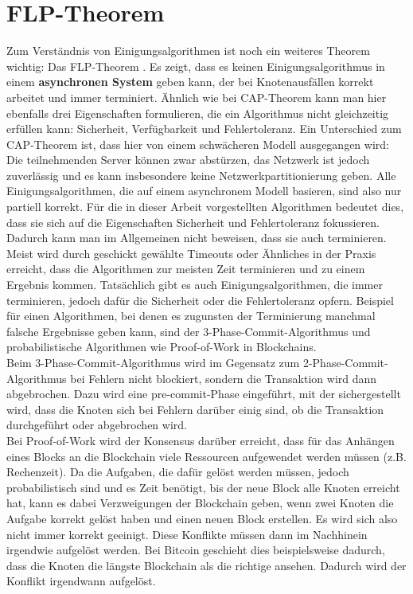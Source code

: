 \section{FLP-Theorem}

Zum Verständnis von Einigungsalgorithmen ist noch ein weiteres Theorem wichtig: Das FLP-Theorem \cite{flp}. Es zeigt, dass es keinen Einigungsalgorithmus in einem \textbf{asynchronen System} geben kann, der bei Knotenausfällen korrekt arbeitet und immer terminiert. Ähnlich wie bei CAP-Theorem kann man hier ebenfalls drei Eigenschaften formulieren, die ein Algorithmus nicht gleichzeitig erfüllen kann: Sicherheit, Verfügbarkeit und Fehlertoleranz. Ein Unterschied zum CAP-Theorem ist, dass hier von einem schwächeren Modell ausgegangen wird: Die teilnehmenden Server können zwar abstürzen, das Netzwerk ist jedoch zuverlässig und es kann insbesondere keine Netzwerkpartitionierung geben.
Alle Einigungsalgorithmen, die auf einem asynchronem Modell basieren, sind also nur partiell korrekt. Für die in dieser Arbeit vorgestellten Algorithmen bedeutet dies, dass sie sich auf die Eigenschaften Sicherheit und Fehlertoleranz fokussieren. Dadurch kann man im Allgemeinen nicht beweisen, dass sie auch terminieren. Meist wird durch geschickt gewählte Timeouts oder Ähnliches in der Praxis erreicht, dass die Algorithmen zur meisten Zeit terminieren und zu einem Ergebnis kommen.
Tatsächlich gibt es auch Einigungsalgorithmen, die immer terminieren, jedoch dafür die Sicherheit oder die Fehlertoleranz opfern. Beispiel für einen Algorithmen, bei denen es zugunsten der Terminierung manchmal falsche Ergebnisse geben kann, sind der 3-Phase-Commit-Algorithmus \cite{pc} und probabilistische Algorithmen wie Proof-of-Work in Blockchains. \\
Beim 3-Phase-Commit-Algorithmus wird im Gegensatz zum 2-Phase-Commit-Algorithmus bei Fehlern nicht blockiert, sondern die Transaktion wird dann abgebrochen. Dazu wird eine \glqq pre-commit\grqq-Phase eingeführt, mit der sichergestellt wird, dass die Knoten sich bei Fehlern darüber einig sind, ob die Transaktion durchgeführt oder abgebrochen wird. \\
Bei Proof-of-Work wird der Konsensus darüber erreicht, dass für das Anhängen eines Blocks an die Blockchain viele Ressourcen aufgewendet werden müssen (z.B. Rechenzeit).  Da die Aufgaben, die dafür gelöst werden müssen, jedoch probabilistisch sind und es Zeit benötigt, bis der neue Block alle Knoten erreicht hat, kann es dabei Verzweigungen der Blockchain geben, wenn zwei Knoten die Aufgabe korrekt gelöst haben und einen neuen Block erstellen. Es wird sich also nicht immer korrekt geeinigt. Diese Konflikte müssen dann im Nachhinein irgendwie aufgelöst werden. Bei Bitcoin \cite{bitcoin} geschieht dies beispielsweise dadurch, dass die Knoten die längste Blockchain als die \glqq richtige\grqq{} ansehen. Dadurch wird der Konflikt irgendwann aufgelöst.


